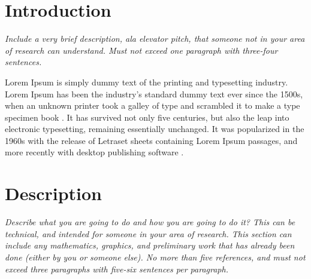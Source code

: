 \documentclass[letterpaper,12pt,fleqn]{article}
\begin{document}
\thispagestyle{empty}

\projecttitle

\section*{Introduction}

\textsl{Include a very brief description, ala elevator pitch, that someone
not in your area of research can understand. Must not exceed one paragraph 
with three-four sentences.}

Lorem Ipsum is simply dummy text of the printing and typesetting \cite{WC1953}
industry. Lorem Ipsum has been the industry's standard dummy text ever 
since the 1500s, when an unknown printer took a galley of type and scrambled 
it to make a type specimen book \cite{TikZPGF}. It has survived not only five 
centuries, but also the leap into electronic typesetting, remaining essentially
unchanged. It was popularized in the 1960s with the release of Letraset sheets 
containing Lorem Ipsum passages, and more recently with desktop publishing 
software \cite{PlanetMath}.

\section*{Description}

\textsl{Describe what you are going to do and how you are going to do it?
This can be technical, and intended for someone in your area of research.
This section can include any mathematics, graphics, and preliminary work
that has already been done (either by you or someone else). No more than
five references, and must not exceed three paragraphs with five-six sentences 
per paragraph.}
\end{document}

